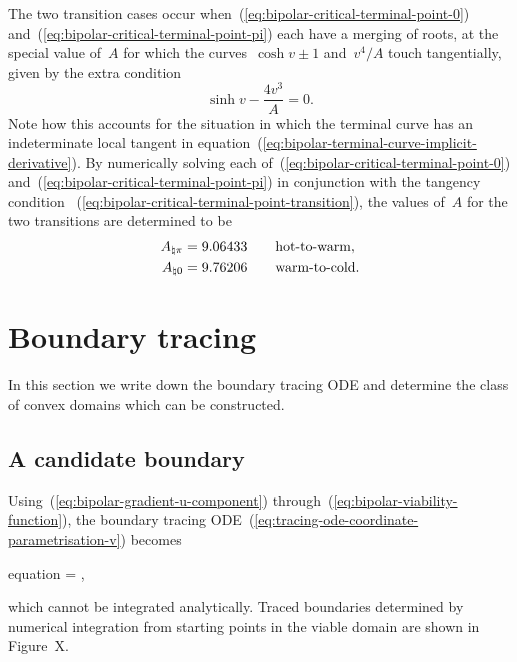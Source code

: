 The two transition cases occur
when~(\ref{eq:bipolar-critical-terminal-point-0})
and~(\ref{eq:bipolar-critical-terminal-point-pi})
each have a merging of roots,
at the special value of~$A$
for which the curves~$\cosh v \pm 1$ and~$v^4 / A$
touch tangentially,
given by the extra condition
\begin{equation}
  \sinh v - \frac{4 v^3}{A} = 0.
  \label{eq:bipolar-critical-terminal-point-transition}
\end{equation}
Note how this accounts for the situation in which
the terminal curve has an indeterminate local tangent
in equation~(\ref{eq:bipolar-terminal-curve-implicit-derivative}).
By numerically solving each of~(\ref{eq:bipolar-critical-terminal-point-0})
and~(\ref{eq:bipolar-critical-terminal-point-pi})
in conjunction with the tangency condition~%
  (\ref{eq:bipolar-critical-terminal-point-transition}),
the values of~$A$ for the two transitions are determined to be
\begin{align}
  A_{\natural \pi} &= 9.06433 \qquad \text{hot-to-warm},
    \label{eq:bipolar-transition-a-hot-to-warm}
    \\
  A_{\natural 0} &= 9.76206 \qquad \text{warm-to-cold}.
    \label{eq:bipolar-transition-a-warm-to-cold}
\end{align}

\section{Boundary tracing}
\label{sec:bipolar.tracing}

In this section we write down the boundary tracing ODE
and determine the class of convex domains which can be constructed.

\subsection{A candidate boundary}
\label{sec:bipolar.tracing.candidate}

Using~(\ref{eq:bipolar-gradient-u-component})
through~(\ref{eq:bipolar-viability-function}),
the boundary tracing ODE~(\ref{eq:tracing-ode-coordinate-parametrisation-v})
becomes
\begin{important}{equation}
   =
    \pm
    ,
  \label{eq:bipolar-tracing-ode-coordinate-parametrisation-v}
\end{important}
which cannot be integrated analytically.
Traced boundaries determined by numerical integration
from starting points in the viable domain
are shown in Figure~X. %

